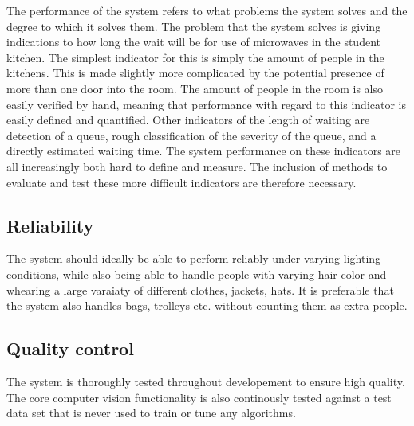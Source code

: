 The performance of the system refers to what problems the system solves and the degree to which it solves them. The problem that the system solves is giving indications to how long the wait will be for use of microwaves in the student kitchen. The simplest indicator for this is simply the amount of people in the kitchens. This is made slightly more complicated by the potential presence of more than one door into the room. The amount of people in the room is also easily verified by hand, meaning that performance with regard to this indicator is easily defined and quantified. Other indicators of the length of waiting are detection of a queue, rough classification of the severity of the queue, and a directly estimated waiting time. The system performance on these indicators are all increasingly both hard to define and measure. The inclusion of methods to evaluate and test these more difficult indicators are therefore necessary.

\subsection{Reliability}
The system should ideally be able to perform reliably under varying lighting conditions, while also being able to handle people with varying hair color and whearing a large varaiaty of different clothes, jackets, hats. It is preferable that the system also handles bags, trolleys etc. without counting them as extra people. 

\subsection{Quality control}
The system is thoroughly tested throughout developement to ensure high quality. The core computer vision functionality is also continously tested against a test data set that is never used to train or tune any algorithms. 
\newpage

